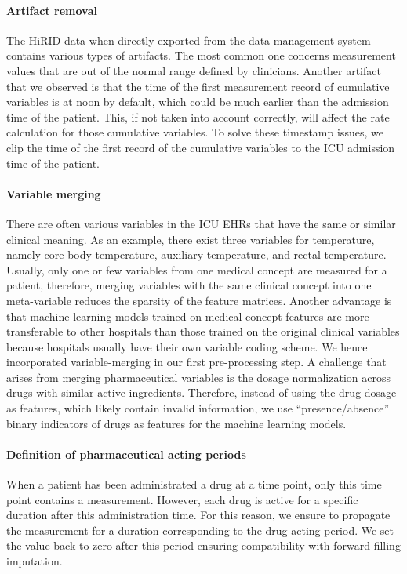\documentclass{article}
\begin{document}
\paragraph{Artifact removal} The HiRID data when directly exported from the data management system contains various types of artifacts. The most common one concerns measurement values that are out of the normal range defined by clinicians. Another artifact that we observed is that the time of the first measurement record of cumulative variables is at noon by default, which could be much earlier than the admission time of the patient. This, if not taken into account correctly, will affect the rate calculation for those cumulative variables.
To solve these timestamp issues, we clip the time of the first record of 
the cumulative variables to the ICU admission time of the patient.

\paragraph{Variable merging} There are often various variables in the ICU EHRs that have the same or similar clinical meaning. As an example, there exist three variables for temperature, namely core body temperature, auxiliary temperature, and rectal temperature. 
Usually, only one or few variables from one medical concept are measured for a patient, therefore, merging variables with the same clinical concept into one meta-variable reduces the sparsity of the feature matrices.
Another advantage is that machine learning models trained on medical concept features are more transferable to other hospitals than those trained on the original clinical variables because hospitals usually have their own variable coding scheme.  We hence incorporated variable-merging in our first pre-processing step. 
A challenge that arises from merging pharmaceutical variables is the dosage normalization across drugs with similar active ingredients.
Therefore, instead of using the drug dosage as features, which likely contain invalid information, we use ``presence/absence'' binary indicators of drugs as features for the machine learning models.

\paragraph{Definition of pharmaceutical acting periods} When a patient has been administrated a drug at a time point, only this time point contains a measurement. However, each drug is active for a specific duration after this administration time. For this reason, we ensure to propagate the measurement for a duration corresponding to the drug acting period. We set the value back to zero after this period ensuring compatibility with forward filling imputation. 
\end{document}

